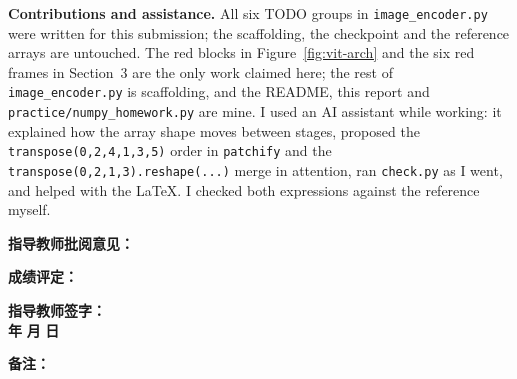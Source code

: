 \documentclass[a4paper,12pt]{article}
\begin{document}
\textbf{Contributions and assistance.} All six TODO groups in
\texttt{image\_encoder.py} were written for this submission; the scaffolding,
the checkpoint and the reference arrays are untouched. The red blocks in
Figure~\ref{fig:vit-arch} and the six red frames in Section~3 are the only work
claimed here; the rest of \texttt{image\_encoder.py} is scaffolding, and the
README, this report and \texttt{practice/numpy\_homework.py} are mine. I used an AI
assistant while working: it explained how the array shape moves between stages, proposed the
\texttt{transpose(0,2,4,1,3,5)} order in \texttt{patchify} and the
\texttt{transpose(0,2,1,3).reshape(...)} merge in attention, ran
\texttt{check.py} as I went, and helped with the \LaTeX. I checked both
expressions against the reference myself.

\par

\newpage



\vspace{1cm}

\noindent \textbf{指导教师批阅意见：}
\vspace{6cm}
\hfill

\vspace{1cm}

\noindent \textbf{成绩评定：}
\vspace{2cm}
\hfill

\vspace{1cm}

\noindent
\hfill
\textbf{指导教师签字：}\quad\quad\quad\quad\quad\\[0.5cm]

\hfill
\textbf{年}\quad\quad
\textbf{月}\quad\quad
\textbf{日}\quad

\vspace{1cm}

\noindent \textbf{备注：}
\end{document}
